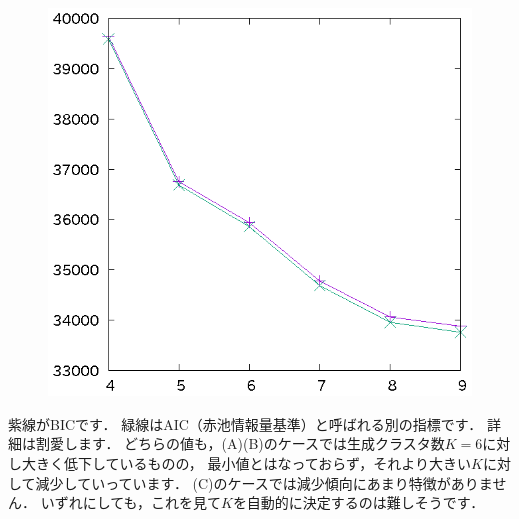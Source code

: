 ﻿\documentclass{jsarticle}
\begin{document}
\begin{figure}[h]
\begin{center}
\begin{minipage}{.32\textwidth}
\begin{center}
 \end{center}
 \end{minipage}
 \begin{minipage}{.32\textwidth}
 \begin{center}
 \includegraphics[height=.18\textheight]{fig/gmm3_bic.eps}
 \end{center}
 \end{minipage}
\end{center}
\end{figure}
紫線がBICです．
緑線はAIC（赤池情報量基準）\cite{bib:akaike1973}と呼ばれる別の指標です．
詳細は割愛します．
どちらの値も，(A)(B)のケースでは生成クラスタ数$K=6$に対し大きく低下しているものの，
最小値とはなっておらず，それより大きい$K$に対して減少していっています．
(C)のケースでは減少傾向にあまり特徴がありません．
いずれにしても，これを見て$K$を自動的に決定するのは難しそうです．
\end{document}

